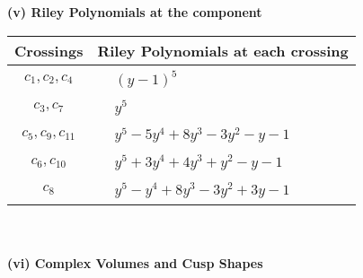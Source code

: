\documentclass[1p]{elsarticle_modified}
\theoremstyle{definition}
\begin{document}
\newpage\renewcommand{\arraystretch}{1}
\flushleft \textbf{(v) Riley Polynomials at the component}\newline \\
\begin{tabular}{m{50pt}|m{274pt}}
Crossings & \hspace{64pt}Riley Polynomials at each crossing \\
\hline $$\begin{aligned}c_{1},c_{2},c_{4}\end{aligned}$$&$\begin{aligned}
&(y-1)^5
\end{aligned}$\\
\hline $$\begin{aligned}c_{3},c_{7}\end{aligned}$$&$\begin{aligned}
&y^5
\end{aligned}$\\
\hline $$\begin{aligned}c_{5},c_{9},c_{11}\end{aligned}$$&$\begin{aligned}
&y^5-5 y^4+8 y^3-3 y^2- y-1
\end{aligned}$\\
\hline $$\begin{aligned}c_{6},c_{10}\end{aligned}$$&$\begin{aligned}
&y^5+3 y^4+4 y^3+y^2- y-1
\end{aligned}$\\
\hline $$\begin{aligned}c_{8}\end{aligned}$$&$\begin{aligned}
&y^5- y^4+8 y^3-3 y^2+3 y-1
\end{aligned}$\\
\hline
\end{tabular}\\~\\
\newpage\flushleft \textbf{(vi) Complex Volumes and Cusp Shapes}
\end{document}
